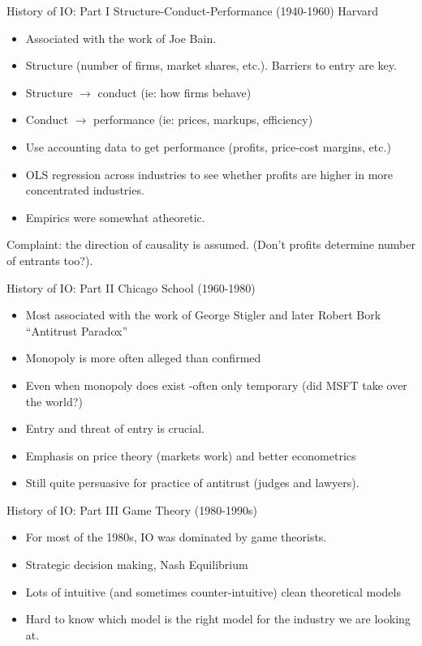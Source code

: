 \begin{frame}{History of IO: Part I}
Structure-Conduct-Performance (1940-1960) Harvard
\begin{itemize}
\item Associated with the work of Joe Bain.
\item Structure (number of firms, market shares, etc.). Barriers to entry are key.
\item Structure $\rightarrow$ conduct (ie: how firms behave)
\item Conduct $\rightarrow$ performance (ie: prices, markups, efficiency)
\item Use accounting data to get performance (profits, price-cost margins, etc.)
\item OLS regression across industries to see whether profits are higher in more concentrated industries.
\item Empirics were somewhat atheoretic.
\end{itemize}
Complaint: the direction of causality is assumed. (Don't profits determine number of entrants too?).
\end{frame}

\begin{frame}{History of IO: Part II}
Chicago School (1960-1980)
\begin{itemize}
\item Most associated with the work of George Stigler and later Robert Bork ``Antitrust Paradox''
\item Monopoly is more often alleged than confirmed
\item Even when monopoly does exist -often only temporary (did MSFT take over the world?)
\item Entry and threat of entry is crucial.
\item Emphasis on price theory (markets work) and better econometrics
\item Still quite persuasive for practice of antitrust (judges and lawyers).
\end{itemize}
\end{frame}


\begin{frame}{History of IO: Part III}
Game Theory (1980-1990s)
\begin{itemize}
\item For most of the 1980s, IO was dominated by game theorists.
\item Strategic decision making, Nash Equilibrium
\item Lots of intuitive (and sometimes counter-intuitive) clean theoretical models
\item Hard to know which model is the right model for the industry we are looking at.
\end{itemize}
\end{frame}


